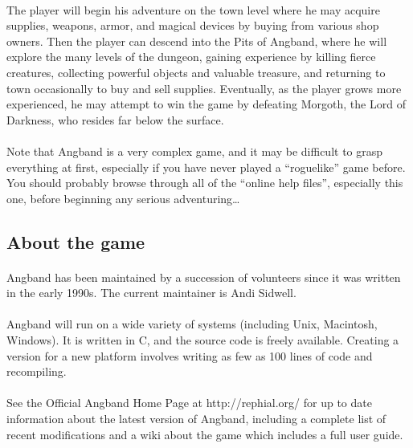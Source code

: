 \paragraph{}The player will begin his adventure on the town level where he may
acquire supplies, weapons, armor, and magical devices by buying from
various shop owners. Then the player can descend into the Pits of
Angband, where he will explore the many levels of the dungeon, gaining
experience by killing fierce creatures, collecting powerful objects and
valuable treasure, and returning to town occasionally to buy and sell
supplies. Eventually, as the player grows more experienced, he may
attempt to win the game by defeating Morgoth, the Lord of Darkness, who
resides far below the surface.

\paragraph{}Note that Angband is a very complex game, and it may be difficult to
grasp everything at first, especially if you have never played a
``roguelike'' game before. You should probably browse through all of the
``online help files'', especially this one, before beginning any serious
adventuring\ldots

\subsection{About the game}
\paragraph{}Angband has been maintained by a succession of volunteers since it was
written in the early 1990s. The current maintainer is Andi Sidwell.

\paragraph{}Angband will run on a wide variety of systems (including Unix,
Macintosh, Windows). It is written in C, and the source code is freely
available. Creating a version for a new platform involves writing as few
as 100 lines of code and recompiling.

\paragraph{}See the Official Angband Home Page at http://rephial.org/ for up to date
information about the latest version of Angband, including a complete
list of recent modifications and a wiki about the game which includes a
full user guide.


